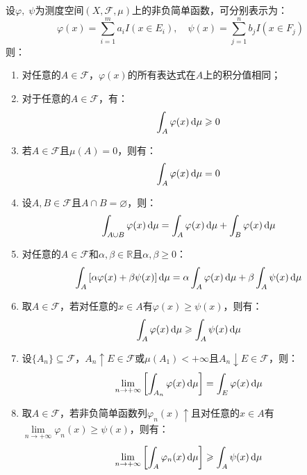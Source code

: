 \begin{property}\label{prop:NonnegativeSimpleIntegral}
	设$\varphi,\;\psi$为测度空间$(X,\mathscr{F},\mu)$上的非负简单函数，可分别表示为：
	\begin{equation*}
		\varphi(x)=\sum_{i=1}^{m}a_iI(x\in E_i),\quad
		\psi(x)=\sum_{j=1}^{n}b_jI(x\in F_j)
	\end{equation*}
	则：
	\begin{enumerate}
		\item 对任意的$A\in\mathscr{F}$，$\varphi(x)$的所有表达式在$A$上的积分值相同；
		\item 对于任意的$A\in\mathscr{F}$，有：
		\begin{equation*}
			\int_{A}\varphi(x)\mathop{}\!\mathrm{d}\mu\geqslant0
		\end{equation*}
		\item 若$A\in\mathscr{F}$且$\mu(A)=0$，则有：
		\begin{equation*}
			\int_{A}\varphi(x)\mathop{}\!\mathrm{d}\mu=0
		\end{equation*}
		\item 设$A,B\in\mathscr{F}$且$A\cap B=\varnothing$，则：
		\begin{equation*}
			\int_{A\cup B}\varphi(x)\mathop{}\!\mathrm{d}\mu=\int_{A}\varphi(x)\mathop{}\!\mathrm{d}\mu+\int_{B}\varphi(x)\mathop{}\!\mathrm{d}\mu
		\end{equation*}
		\item 对任意的$A\in\mathscr{F}$和$\alpha,\beta\in \mathbb{R}$且$\alpha,\beta\geqslant0$：
		\begin{equation*}
			\int_{A}\left[\alpha\varphi(x)+\beta\psi(x)\right]\mathop{}\!\mathrm{d}\mu
			=\alpha\int_{A}\varphi(x)\mathop{}\!\mathrm{d}\mu+\beta\int_{A}\psi(x)\mathop{}\!\mathrm{d}\mu
		\end{equation*}
		\item 取$A\in\mathscr{F}$，若对任意的$x\in A$有$\varphi(x)\geqslant \psi(x)$，则有：
		\begin{equation*}
			\int_{A}\varphi(x)\mathop{}\!\mathrm{d}\mu\geqslant\int_{A}\psi(x)\mathop{}\!\mathrm{d}\mu
		\end{equation*}
		\item 设$\{A_n\}\subseteq\mathscr{F}$，$A_n\uparrow E\in\mathscr{F}$或$\mu(A_1)<+\infty$且$A_n\downarrow E\in\mathscr{F}$，则：
		\begin{equation*}
			\lim_{n\to+\infty}\left[\int_{A_n}\varphi(x)\mathop{}\!\mathrm{d}\mu\right]=\int_{E}\varphi(x)\mathop{}\!\mathrm{d}\mu
		\end{equation*}
		\item 取$A\in\mathscr{F}$，若非负简单函数列$\varphi_n(x)\uparrow$且对任意的$x\in A$有$\lim\limits_{n\to+\infty}\varphi_n(x)\geqslant \psi(x)$，则有：
		\begin{equation*}
			\lim_{n\to+\infty}\left[\int_{A}\varphi_n(x)\mathop{}\!\mathrm{d}\mu\right]\geqslant\int_{A}\psi(x)\mathop{}\!\mathrm{d}\mu
		\end{equation*}
	\end{enumerate}
\end{property}
